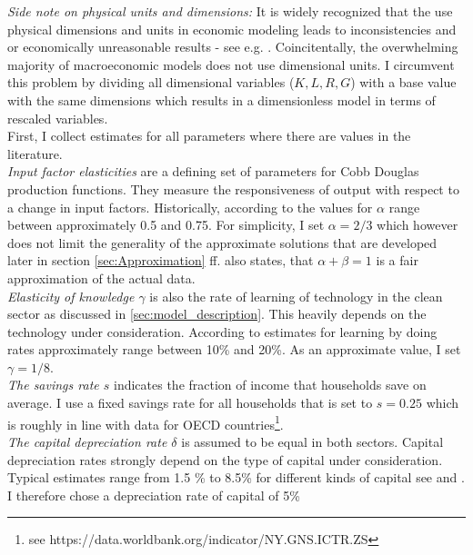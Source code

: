 \textit{Side note on physical units and dimensions:} It is widely recognized that the use physical dimensions and units in economic modeling leads to inconsistencies and or economically unreasonable results - see e.g. \cite{Barnett2007}. Coincitentally, the overwhelming majority of macroeconomic models does not use dimensional units. I circumvent this problem by dividing all dimensional variables ($K, L, R, G$) with a base value with the same dimensions which results in a dimensionless model in terms of rescaled variables.\\

First, I collect estimates for all parameters where there are values in the literature.\\

\textit{Input factor elasticities} are a defining set of parameters for Cobb Douglas production functions. They measure the responsiveness of output with respect to a change in input factors. Historically, according to \cite{Douglas1976} the values for $\alpha$ range between approximately 0.5 and 0.75. For simplicity, I set $\alpha=2/3$ which however does not limit the generality of the approximate solutions that are developed later in section \ref{sec:Approximation} ff. \cite{Douglas1976} also states, that $\alpha+\beta=1$ is a fair approximation of the actual data.\\

\textit{Elasticity of knowledge $\gamma$} is also the rate of learning of technology in the clean sector as discussed in \ref{sec:model_description}. This heavily depends on the technology under consideration. According to \cite{Kahouli-Brahmi2008} estimates for learning by doing rates approximately range between 10\% and 20\%. As an approximate value, I set $\gamma=1/8$. \\

\textit{The savings rate $s$} indicates the fraction of income that households save on average. I use a fixed savings rate for all households that is set to $s=0.25$ which is roughly in line with data for OECD countries\footnote{see https://data.worldbank.org/indicator/NY.GNS.ICTR.ZS}.\\

\textit{The capital depreciation rate $\delta$} is assumed to be equal in both sectors. Capital depreciation rates strongly depend on the type of capital under consideration. Typical estimates range from 1.5 \% to 8.5\% for different kinds of capital see \cite{Kamps2005} and 
\cite{Gupta2014}. I therefore chose a depreciation rate of capital of 5\%\\

